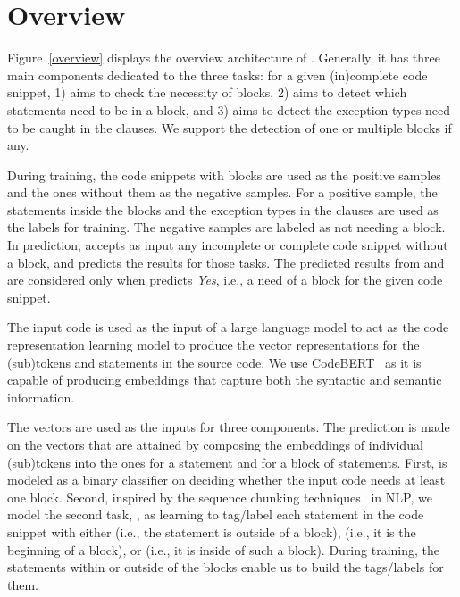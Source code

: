 \section{{\tool} Overview}
\label{sec:overview}

Figure~\ref{overview} displays the overview architecture of
{\tool}. Generally, it has three main components dedicated to the
three tasks: for a given (in)complete code snippet, 1) {\xblock} aims
to check the necessity of  blocks, 2){\xstate} aims to
detect which statements need to be in a  block, and 3)
{\xtype} aims to detect the exception types need to be caught in the
 clauses. We support the detection of one or multiple
 blocks if any.

During training, the code snippets with  blocks are
used as the positive samples and the ones without them as the negative
samples. For a positive sample, the statements inside the 
blocks and the exception types in the  clauses are used as
the labels for training. The negative samples are labeled as not
needing a  block. In prediction, {\tool} accepts as
input any incomplete or complete code snippet without a
 block, and predicts the results for those tasks. The
predicted results from {\xstate} and {\xtype} are considered only when
{\xblock} predicts {\em Yes}, i.e., a need of a 
block for the given code snippet.

The input code is used as the input of a large language model to act
as the code representation learning model to produce the vector
representations for the (sub)tokens and statements in the source
code. We use CodeBERT~\cite{codebert-emnlp20} as it is
capable of producing embeddings that capture both the
syntactic and semantic information.

The vectors are used as the inputs for three components. The
prediction is made on the vectors that are attained by composing the
embeddings of individual (sub)tokens into the ones for a statement and
for a block of statements. First, {\xblock} is modeled as a binary
classifier on deciding whether the input code needs at least one
 block. Second, inspired by the sequence chunking
techniques~\cite{sequence-chunking-aaai17} in NLP, we model the second
task, {\xstate}, as learning to tag/label each statement in the code
snippet with either  (i.e., the statement is outside of a
 block),  (i.e., it is the beginning of a
 block), or  (i.e., it is inside of such a
block).
During training, the statements within or outside of the
 blocks enable us to build the tags/labels for them.

